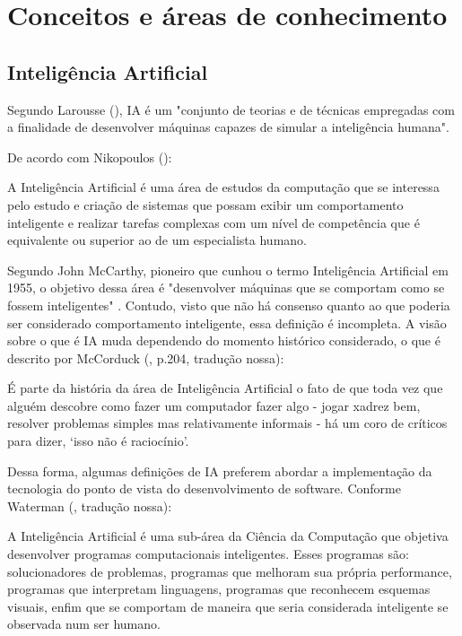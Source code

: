 \section{Conceitos e áreas de conhecimento}

\subsection {Inteligência Artificial}
Segundo Larousse (\citeyear{larousse99}), IA é um "conjunto de teorias e de técnicas empregadas com a finalidade de desenvolver máquinas capazes de simular a inteligência humana". 

De acordo com Nikopoulos (\citeyear{nikopoulos97}):

\begin{citacao}
A Inteligência Artificial é uma área de estudos da computação que se interessa pelo estudo e criação de sistemas que possam exibir um comportamento inteligente e realizar tarefas complexas com um nível de competência que é equivalente ou superior ao de um especialista humano.
\end{citacao}

Segundo John McCarthy, pioneiro que cunhou o termo Inteligência Artificial em 1955, o objetivo dessa área é "desenvolver máquinas que se comportam como se fossem inteligentes" \cite{wolf17}. Contudo, visto que não há consenso quanto ao que poderia ser considerado comportamento inteligente, essa definição é incompleta. A visão sobre o que é IA muda dependendo do momento histórico considerado, o que é descrito por McCorduck (\citeyear{corduck04}, p.204, tradução nossa):

\begin{citacao}
É parte da história da área de Inteligência Artificial o fato de que toda vez que alguém descobre como fazer um computador fazer algo - jogar xadrez bem, resolver problemas simples mas relativamente informais - há um coro de críticos para dizer, ‘isso não é raciocínio’.
\end{citacao}

Dessa forma, algumas definições de IA preferem abordar a implementação da tecnologia do ponto de vista do desenvolvimento de software. Conforme Waterman (\citeyear{waterman85}, tradução nossa):

\begin{citacao}
A Inteligência Artificial é uma sub-área da Ciência da Computação que objetiva desenvolver programas computacionais inteligentes. Esses programas são: solucionadores de problemas, programas que melhoram sua própria performance, programas que interpretam linguagens, programas que reconhecem esquemas visuais, enfim que se comportam de maneira que seria considerada inteligente se observada num ser humano.
\end{citacao}

